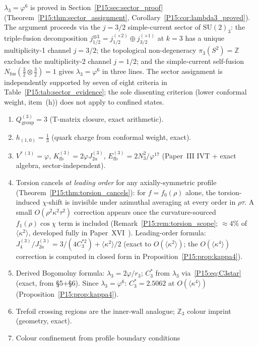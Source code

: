 \documentclass[11pt,a4paper]{article}
\theoremstyle{definition}\newtheorem{definition}[theorem]{Definition}
\theoremstyle{remark}
\newcommand{\vp}{\varphi}
\newcommand{\lam}{\lambda}
\newcommand{\Ja}{J_{2a}}
\newcommand{\Efb}{E_{\mathrm{fb}}}
\newcommand{\Kfb}{K_{\mathrm{fb}}}
\begin{document}
$\lam_3=\vp^6$ is proved in Section~\ref{P15:sec:sector_proof}
(Theorem~\ref{P15:thm:sector_assignment}, Corollary~\ref{P15:cor:lambda3_proved}).
The argument proceeds via the $j=3/2$ simple-current sector of
$\mathrm{SU}(2)_3$: the triple-fusion decomposition
$j_{1/2}^{\otimes 3}=j_{1/2}^{(\times 2)}\oplus j_{3/2}^{(\times 1)}$
at $k=3$ has a unique multiplicity-1 channel $j=3/2$; the topological
non-degeneracy $\pi_3(S^2)=\mathbb{Z}$ excludes the multiplicity-2 channel
$j=1/2$; and the simple-current self-fusion
$N_{\mathrm{fus}}(\tfrac32\otimes\tfrac32)=1$ gives $\lam_3=\vp^6$ in
three lines.
The sector assignment is independently supported by seven of eight criteria
in Table~\ref{P15:tab:sector_evidence}; the sole dissenting criterion (lower
conformal weight, item~(h)) does not apply to confined states.

\begin{enumerate}[noitemsep,label=(\arabic*)]
\item $Q_{\mathrm{group}}^{(3)}=3$ (T-matrix closure, exact arithmetic).
\item $h_{(1,0)}=\tfrac{1}{3}$ (quark charge from conformal weight, exact).
\item $V^{*\,(3)}=\vp$, $\Kfb^{(3)}=2\vp\Ja^{(3)}$, $\Efb^{(3)}=2N_3^2/\vp^{17}$
  (Paper~III IVT + exact algebra, sector-independent).
\item Torsion cancels \emph{at leading order} for any axially-symmetric
  profile (Theorem~\ref{P15:thm:torsion_cancels}): for $f=f_0(\rho)$ alone,
  the torsion-induced $\chi$-shift is invisible under azimuthal
  averaging at every order in $\rho\tau$. A small $O(\rho^2\kappa^2\tau^2)$
  correction appears once the curvature-sourced $f_1(\rho)\cos\chi$ term
  is included (Remark~\ref{P15:rem:torsion_scope}; $\approx 4\%$ of
  $\langle\kappa^2\rangle$, developed fully in Paper~XVI~\cite{Paper16}).
  Leading-order formula:
  $J_4^{(3)}/J_{2a}^{(3)}=3/(4C_3^{*2})+\langle\kappa^2\rangle/2$ (exact to
  $O(\langle\kappa^2\rangle)$; the $O(\langle\kappa^4\rangle)$ correction is
  computed in closed form in Proposition~\ref{P15:prop:kappa4}).
\item Derived Bogomolny formula: $\lam_3=2\vp/r_3$;
  $C_3^*$ from $\lam_3$ via~\eqref{P15:eq:C3star} (exact, from §5+§6).
  Since $\lam_3=\vp^6$: $C_3^*=2.5062$ at $O(\langle\kappa^4\rangle)$
  (Proposition~\ref{P15:prop:kappa4}).
\item Trefoil crossing regions are the inner-wall analogue;
  $\mathbb{Z}_3$ colour imprint (geometry, exact).
\item Colour confinement from profile boundary conditions

\end{enumerate}
\end{document}
